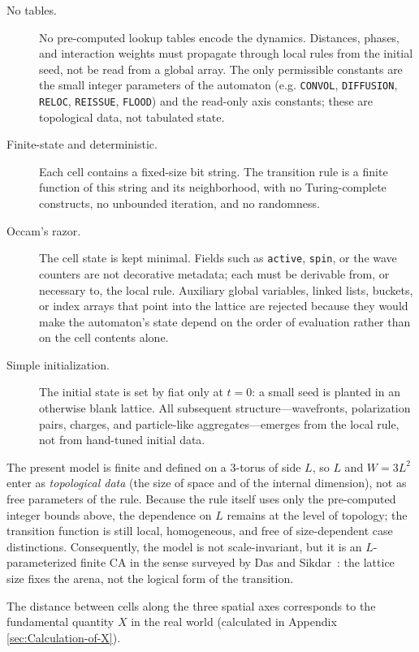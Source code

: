 \documentclass{ijuc}
\begin{document}
\begin{description}
    \item[No tables.]  No pre-computed lookup tables encode the dynamics.  Distances, phases, and interaction weights must propagate through local rules from the initial seed, not be read from a global array.  The only permissible constants are the small integer parameters of the automaton (e.g. \texttt{CONVOL}, \texttt{DIFFUSION}, \texttt{RELOC}, \texttt{REISSUE}, \texttt{FLOOD}) and the read-only axis constants; these are topological data, not tabulated state.
    \item[Finite-state and deterministic.]  Each cell contains a fixed-size bit string.  The transition rule is a finite function of this string and its neighborhood, with no Turing-complete constructs, no unbounded iteration, and no randomness.
    \item[Occam's razor.]  The cell state is kept minimal.  Fields such as \texttt{active}, \texttt{spin}, or the wave counters are not decorative metadata; each must be derivable from, or necessary to, the local rule.  Auxiliary global variables, linked lists, buckets, or index arrays that point into the lattice are rejected because they would make the automaton's state depend on the order of evaluation rather than on the cell contents alone.
    \item[Simple initialization.]  The initial state is set by fiat only at $t=0$: a small seed is planted in an otherwise blank lattice.  All subsequent structure---wavefronts, polarization pairs, charges, and particle-like aggregates---emerges from the local rule, not from hand-tuned initial data.
\end{description}

The present model is finite and defined on a $3$-torus of side $L$, so $L$ and $W=3L^{2}$ enter as \emph{topological data} (the size of space and of the internal dimension), not as free parameters of the rule.  Because the rule itself uses only the pre-computed integer bounds above, the dependence on $L$ remains at the level of topology; the transition function is still local, homogeneous, and free of size-dependent case distinctions.  Consequently, the model is not scale-invariant, but it is an $L$-parameterized finite CA in the sense surveyed by Das and Sikdar~\cite{das2025nonuniform}: the lattice size fixes the arena, not the logical form of the transition.

The distance between cells along the three spatial axes corresponds to the fundamental quantity $X$ in the real world (calculated in Appendix \ref{sec:Calculation-of-X}).
\end{document}
